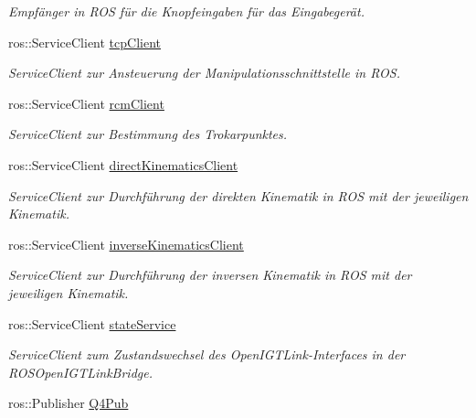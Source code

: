 \begin{DoxyCompactItemize}
\begin{DoxyCompactList}\small\item\em Empfänger in R\-O\-S für die Knopfeingaben für das Eingabegerät. \end{DoxyCompactList}\item 
\hypertarget{classICommander_a70e1238a1a2b14736c467ffc6d658648}{ros\-::\-Service\-Client \hyperlink{classICommander_a70e1238a1a2b14736c467ffc6d658648}{tcp\-Client}}\label{classICommander_a70e1238a1a2b14736c467ffc6d658648}

\begin{DoxyCompactList}\small\item\em Service\-Client zur Ansteuerung der Manipulationsschnittstelle in R\-O\-S. \end{DoxyCompactList}\item 
\hypertarget{classICommander_a441d8b0887e38b3e3856884f5a4e188d}{ros\-::\-Service\-Client \hyperlink{classICommander_a441d8b0887e38b3e3856884f5a4e188d}{rcm\-Client}}\label{classICommander_a441d8b0887e38b3e3856884f5a4e188d}

\begin{DoxyCompactList}\small\item\em Service\-Client zur Bestimmung des Trokarpunktes. \end{DoxyCompactList}\item 
\hypertarget{classICommander_a2e2cbc4750713bd9374e9d818d63745b}{ros\-::\-Service\-Client \hyperlink{classICommander_a2e2cbc4750713bd9374e9d818d63745b}{direct\-Kinematics\-Client}}\label{classICommander_a2e2cbc4750713bd9374e9d818d63745b}

\begin{DoxyCompactList}\small\item\em Service\-Client zur Durchführung der direkten Kinematik in R\-O\-S mit der jeweiligen Kinematik. \end{DoxyCompactList}\item 
\hypertarget{classICommander_a284d04230dd8431983c33eefcd2dc84b}{ros\-::\-Service\-Client \hyperlink{classICommander_a284d04230dd8431983c33eefcd2dc84b}{inverse\-Kinematics\-Client}}\label{classICommander_a284d04230dd8431983c33eefcd2dc84b}

\begin{DoxyCompactList}\small\item\em Service\-Client zur Durchführung der inversen Kinematik in R\-O\-S mit der jeweiligen Kinematik. \end{DoxyCompactList}\item 
ros\-::\-Service\-Client \hyperlink{classICommander_a2a10e7e0d95c6fe556879527ea18806e}{state\-Service}
\begin{DoxyCompactList}\small\item\em Service\-Client zum Zustandswechsel des Open\-I\-G\-T\-Link-\/\-Interfaces in der R\-O\-S\-Open\-I\-G\-T\-Link\-Bridge. \end{DoxyCompactList}\item 
\hypertarget{classICommander_aa8b8c2d60e8a21ac1ce39041647465e6}{ros\-::\-Publisher \hyperlink{classICommander_aa8b8c2d60e8a21ac1ce39041647465e6}{Q4\-Pub}}\label{classICommander_aa8b8c2d60e8a21ac1ce39041647465e6}


\end{DoxyCompactItemize}
